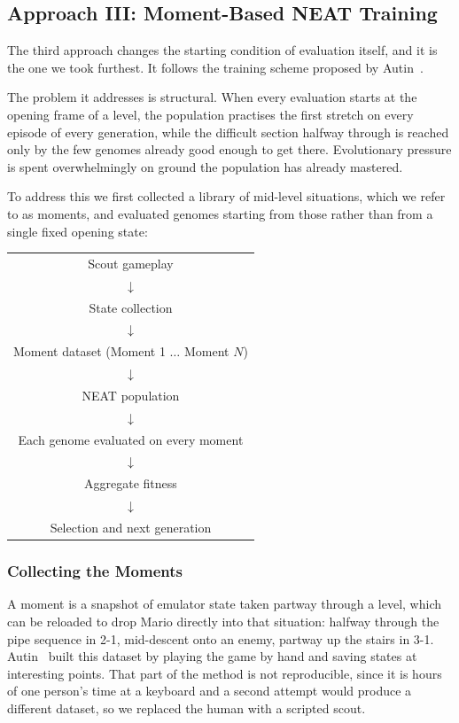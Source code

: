 \subsection{Approach III: Moment-Based NEAT Training}
\label{subsec:approach-moments}

The third approach changes the starting condition of evaluation itself, and it
is the one we took furthest. It follows the training scheme proposed by
Autin~\cite{autin2024}.

\noindent
The problem it addresses is structural. When every evaluation starts at the
opening frame of a level, the population practises the first stretch on every
episode of every generation, while the difficult section halfway through is
reached only by the few genomes already good enough to get there. Evolutionary
pressure is spent overwhelmingly on ground the population has already mastered.

\noindent
To address this we first collected a library of mid-level situations, which we
refer to as moments, and evaluated genomes starting from those rather than from
a single fixed opening state:

\begin{center}
\begin{tabular}{c}
Scout gameplay \\
$\downarrow$ \\
State collection \\
$\downarrow$ \\
Moment dataset (Moment 1 $\ldots$ Moment $N$) \\
$\downarrow$ \\
NEAT population \\
$\downarrow$ \\
Each genome evaluated on every moment \\
$\downarrow$ \\
Aggregate fitness \\
$\downarrow$ \\
Selection and next generation \\
\end{tabular}
\end{center}

\subsubsection{Collecting the Moments}

A moment is a snapshot of emulator state taken partway through a level, which
can be reloaded to drop Mario directly into that situation: halfway through the
pipe sequence in 2-1, mid-descent onto an enemy, partway up the stairs in 3-1.
Autin~\cite{autin2024} built this dataset by playing the game by hand and
saving states at interesting points. That part of the method is not
reproducible, since it is hours of one person's time at a keyboard and a second
attempt would produce a different dataset, so we replaced the human with a
scripted scout.

